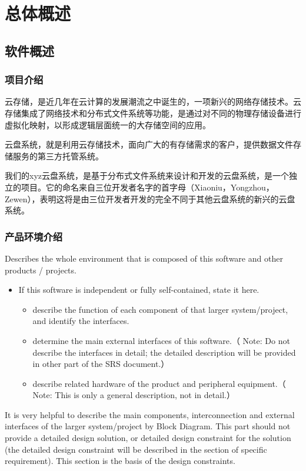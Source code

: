 \chapter{总体概述}

\section{软件概述}
\subsection{项目介绍}
云存储，是近几年在云计算的发展潮流之中诞生的，一项新兴的网络存储技术。云存储集成了网络技术和分布式文件系统等功能，是通过对不同的物理存储设备进行虚拟化映射，以形成逻辑层面统一的大存储空间的应用。

云盘系统，就是利用云存储技术，面向广大的有存储需求的客户，提供数据文件存储服务的第三方托管系统。

我们的xyz云盘系统，是基于分布式文件系统来设计和开发的云盘系统，是一个独立的项目。它的命名来自三位开发者名字的首字母（Xiaoniu，Yongzhou，Zewen），表明这将是由三位开发者开发的完全不同于其他云盘系统的新兴的云盘系统。

\subsection{产品环境介绍}
Describes the whole environment that is composed of this software and other products / projects.
\begin{itemize}
\item If this software is independent or fully self-contained, state it here.
\begin{itemize}
\item describe the function of each component of that larger system/project, and identify the interfaces.
\item determine the main external interfaces of this software.（ Note: Do not describe the interfaces in detail; the detailed description will be provided in other part of the SRS document.）
\item describe related hardware of the product and peripheral equipment.（ Note: This is only  a general description, not in detail.）
\end{itemize}
\end{itemize}

It is very helpful to describe the main components, interconnection and external interfaces of the larger system/project by Block Diagram. This part should not provide a detailed design solution, or detailed design constraint for the solution (the detailed design constraint will be described in the section of specific requirement). This section is the basis of the design constraints.

